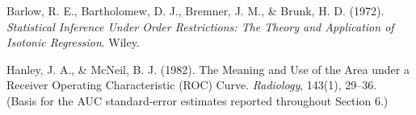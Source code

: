 \documentclass[11pt,a4paper]{article}
\begin{document}
\begin{enumerate}[label={[\arabic*]},leftmargin=2.4em]
\item Barlow, R. E., Bartholomew, D. J., Bremner, J. M., \& Brunk, H. D. (1972).
\textit{Statistical Inference Under Order Restrictions: The Theory and Application of
Isotonic Regression}. Wiley.

\item Hanley, J. A., \& McNeil, B. J. (1982). The Meaning and Use of the Area under a
Receiver Operating Characteristic (ROC) Curve. \textit{Radiology}, 143(1), 29--36.
\\(Basis for the AUC standard-error estimates reported throughout Section 6.)

\end{enumerate}
\end{document}
